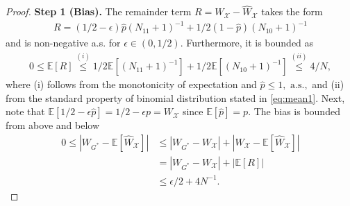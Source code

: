 \documentclass[12pt]{article}
\numberwithin{equation}{section}
\theoremstyle{plain}                         %
\theoremstyle{definition}                  %
\theoremstyle{remark}                      %
\newcommand{\E}{\mathbb{E}}
\begin{document}
  
    \begin{proof}[Proof]
 \textbf{Step 1 (Bias).\;}   The remainder term $ R= W_{\mathcal{X}} - \widehat{W}_{\mathcal{X}}$ takes the form
\begin{align}
R= (1/2-\epsilon) \widehat p (N_{11} + 1)^{-1} +1/2(1-\widehat p ) (N_{10}  + 1)^{-1} \label{eq:remainder}
\end{align}
and is non-negative a.s. for $\epsilon \in (0, 1/2)$.  Furthermore, it is bounded as
\begin{align*}
0 \leq  \E [ R] \overset{(i)}{\leq} 1/2\E [  (N_{11} + 1)^{-1} ] + 1/2\E [  (N_{10} + 1)^{-1} ] \overset{(ii)}{\leq} 4/N,
\end{align*}
where (i) follows from the monotonicity of expectation and $\widehat p \leq 1, \text{ a.s.}, $ and (ii) from the standard property of binomial distribution stated in \eqref{eq:mean1}. Next, note that $\E [ 1/2 - \epsilon \widehat p ] = 1/2 - \epsilon p = W_{\mathcal{X}}$ since $\E [ \widehat p ] = p$.  The bias is bounded from above and below
 \begin{align}
0 \leq |W_{G^{*}} -  \E [ \widehat{W}_{\mathcal{X}}]| &\leq  |W_{G^{*}} -  W_{\mathcal{X}}| + |W_{\mathcal{X}} -  \E [ \widehat{W}_{\mathcal{X}}] | \nonumber  \\
&= |W_{G^{*}} -  W_{\mathcal{X}} |+ |\E [ R ]| \nonumber \\
 &\leq \epsilon/2 + 4 N^{-1}. \label{eq:m0mean} 
\end{align}


\end{proof}
\end{document}
